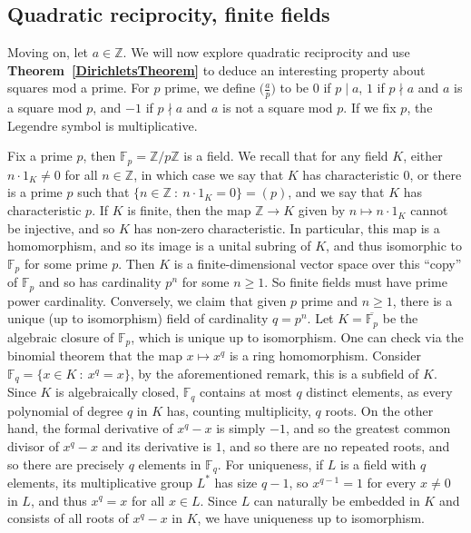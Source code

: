 \documentclass[12pt]{article}
\newcommand{\ints}{\mathbb{Z}}
\newcommand{\intsmod}[1]{\ints / #1 \ints}
\newcommand{\tref}[1]{\textbf{Theorem~\ref{#1}}}
\numberwithin{equation}{section}
\numberwithin{thm}{section}
\numberwithin{lemma}{section}
\numberwithin{cor}{section}
\begin{document}
\subsection{Quadratic reciprocity, finite fields}

Moving on, let $a \in \ints$. We will now explore quadratic reciprocity and use \tref{DirichletsTheorem} to deduce an interesting property about squares mod a prime. For $p$ prime, we define $\big(\frac{a}{p}\big)$ to be $0$ if $p \mid a$, $1$ if $p \nmid a$ and $a$ is a square mod $p$, and $-1$ if $p \nmid a$ and $a$ is not a square mod $p$. If we fix $p$, the Legendre symbol is multiplicative.

Fix a prime $p$, then $\mathbb{F}_p = \intsmod{p}$ is a field. We recall that for any field $K$, either $n \cdot 1_K \ne 0$ for all $n \in \ints$, in which case we say that $K$ has characteristic $0$, or there is a prime $p$ such that $\{ n \in \ints \ : \ n \cdot 1_K = 0 \} = (p)$, and we say that $K$ has characteristic $p$. If $K$ is finite, then the map $\ints \to K$ given by $n \mapsto n \cdot 1_K$ cannot be injective, and so $K$ has non-zero characteristic. In particular, this map is a homomorphism, and so its image is a unital subring of $K$, and thus isomorphic to $\mathbb{F}_p$ for some prime $p$. Then $K$ is a finite-dimensional vector space over this ``copy'' of $\mathbb{F}_p$ and so has cardinality $p^n$ for some $n \geq 1$. So finite fields must have prime power cardinality. Conversely, we claim that given $p$ prime and $n \geq 1$, there is a unique (up to isomorphism) field of cardinality $q = p^n$. Let $K = \overline{\mathbb{F}_p}$ be the algebraic closure of $\mathbb{F}_p$, which is unique up to isomorphism. One can check via the binomial theorem that the map $x \mapsto x^q$ is a ring homomorphism. Consider $\mathbb{F}_q = \{ x \in K \ : \ x^q = x \}$, by the aforementioned remark, this is a subfield of $K$. Since $K$ is algebraically closed, $\mathbb{F}_q$ contains at most $q$ distinct elements, as every polynomial of degree $q$ in $K$ has, counting multiplicity, $q$ roots. On the other hand, the formal derivative of $x^q - x$ is simply $-1$, and so the greatest common divisor of $x^q-x$ and its derivative is $1$, and so there are no repeated roots, and so there are precisely $q$ elements in $\mathbb{F}_q$. For uniqueness, if $L$ is a field with $q$ elements, its multiplicative group $L^*$ has size $q-1$, so $x^{q-1} = 1$ for every $x\ne0$ in $L$, and thus $x^q = x$ for all $x \in L$. Since $L$ can naturally be embedded in $K$ and consists of all roots of $x^q - x$ in $K$, we have uniqueness up to isomorphism.
\end{document}

